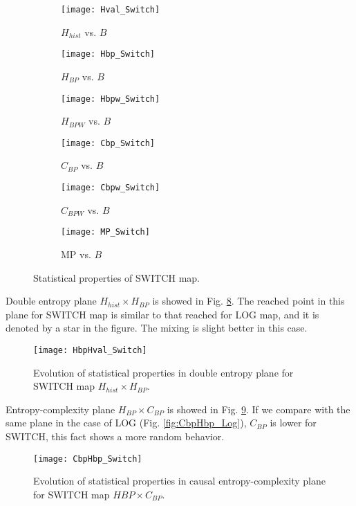 \begin{figure}[htpb]
	\centering
	\begin{subfigure}[b]{0.49\textwidth}
		\texttt{[image: Hval\_Switch]}
		\caption{$H_{hist}$ vs. $B$}
		\label{fig:Hval_Switch}
	\end{subfigure}
	\begin{subfigure}[b]{0.49\textwidth}
		\texttt{[image: Hbp\_Switch]}
		\caption{$H_{BP}$ vs. $B$}
		\label{fig:Hbp_Switch}
	\end{subfigure}
	\begin{subfigure}[b]{0.49\textwidth}
		\texttt{[image: Hbpw\_Switch]}
		\caption{$H_{BPW}$ vs. $B$}
		\label{fig:Hbpw_Switch}
	\end{subfigure}
	\begin{subfigure}[b]{0.49\textwidth}
		\texttt{[image: Cbp\_Switch]}
		\caption{$C_{BP}$ vs. $B$}
		\label{fig:Cbp_Switch}
	\end{subfigure}
	\begin{subfigure}[b]{0.49\textwidth}
		\texttt{[image: Cbpw\_Switch]}
		\caption{$C_{BPW}$ vs. $B$}
		\label{fig:Cbpw_Switch}
	\end{subfigure}
	\begin{subfigure}[b]{0.49\textwidth}
		\texttt{[image: MP\_Switch]}
		\caption{MP vs. $B$}
		\label{fig:MP_Switch}
	\end{subfigure}
	\caption{Statistical properties of SWITCH map.}
	\label{fig:SWITCH_QuantiB}
\end{figure}

Double entropy plane $H_{hist} \times H_{BP}$ is showed in Fig. \ref{fig:SWITCH_HH}.
The reached point in this plane for SWITCH map is similar to that reached for LOG map, and it is denoted by a star in the figure.
The mixing is slight better in this case.

\begin{figure}[htpb]
	\centering
	\texttt{[image: HbpHval\_Switch]}
	\caption{Evolution of statistical properties in double entropy plane for SWITCH map $H_{hist} \times H_{BP}$.}
	\label{fig:SWITCH_HH}
\end{figure}

Entropy-complexity plane $H_{BP} \times C_{BP}$ is showed in Fig. \ref{fig:SWITCH_HC}.
If we compare with the same plane in the case of LOG (Fig. \ref{fig:CbpHbp_Log}), $C_{BP}$ is lower for SWITCH, this fact shows a more random behavior.

\begin{figure}[htpb]
	\centering
	\texttt{[image: CbpHbp\_Switch]}
	\caption{Evolution of statistical properties in causal entropy-complexity plane for SWITCH map $H{BP} \times C_{BP}$.}
	\label{fig:SWITCH_HC}
\end{figure}